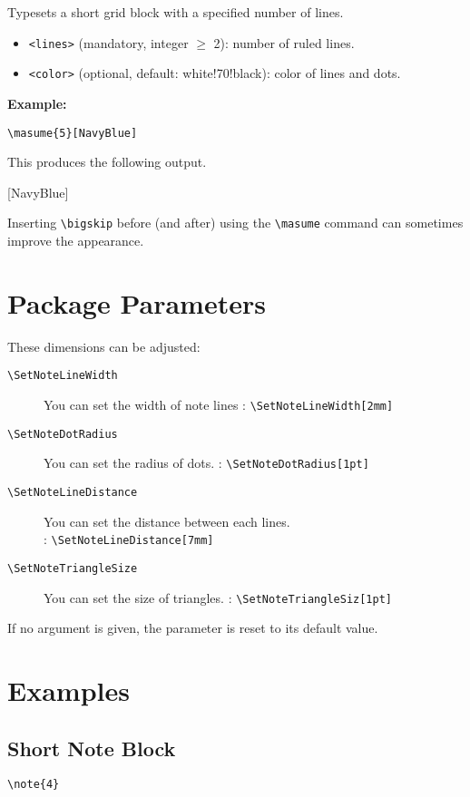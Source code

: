\documentclass[a4paper,12pt]{article}
\begin{document}
Typesets a short grid block with a specified number of lines.

\begin{itemize}
  \item \texttt{<lines>} (mandatory, integer $\ge$ 2): number of ruled lines.
  \item \texttt{<color>} (optional, default: white!70!black): color of lines and dots.
\end{itemize}

\textbf{Example:}
\begin{verbatim}
\masume{5}[NavyBlue]
\end{verbatim}

This produces the following output.\bigskip

[NavyBlue]

\bigskip Inserting \verb|\bigskip| before (and after) using the \verb|\masume| command can sometimes improve the appearance.

\section{Package Parameters}

These dimensions can be adjusted:

\begin{description}
  \item[\texttt{\textbackslash SetNoteLineWidth}] You can set the width of note lines : \verb|\SetNoteLineWidth[2mm]|
  \item[\texttt{\textbackslash SetNoteDotRadius}] You can set the radius of dots. : \verb|\SetNoteDotRadius[1pt]|
  \item[\texttt{\textbackslash SetNoteLineDistance}] You can set the distance between each lines. \\: \verb|\SetNoteLineDistance[7mm]|
  \item[\texttt{\textbackslash SetNoteTriangleSize}] You can set the size of triangles. : \verb|\SetNoteTriangleSiz[1pt]|
\end{description}

If no argument is given, the parameter is reset to its default value.

\section{Examples}

\subsection{Short Note Block}
\begin{verbatim}
\note{4}
\end{verbatim}
\newpage
\end{document}
